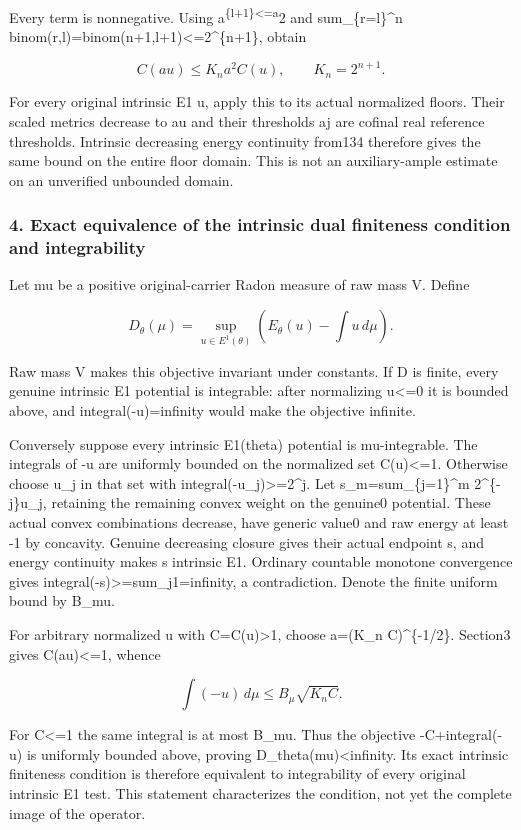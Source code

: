 \documentclass[
  10pt,
]{article}
\begin{document}
Every term is nonnegative. Using a\textsuperscript{\{l+1\}\textless=a}2
and sum\_\{r=l\}\^{}n binom(r,l)=binom(n+1,l+1)\textless=2\^{}\{n+1\},
obtain

\[C(au)\le K_n a^2 C(u),\qquad K_n=2^{n+1}.\]

For every original intrinsic E1 u, apply this to its actual normalized
floors. Their scaled metrics decrease to au and their thresholds aj are
cofinal real reference thresholds. Intrinsic decreasing energy
continuity from134 therefore gives the same bound on the entire floor
domain. This is not an auxiliary-ample estimate on an unverified
unbounded domain.

\subsubsection{4. Exact equivalence of the intrinsic dual finiteness
condition and
integrability}\label{exact-equivalence-of-the-intrinsic-dual-finiteness-condition-and-integrability}

Let mu be a positive original-carrier Radon measure of raw mass V.
Define

\[D_\theta(\mu)=\sup_{u\in E^1(\theta)}
\left(E_\theta(u)-\int u\,d\mu\right).\]

Raw mass V makes this objective invariant under constants. If D is
finite, every genuine intrinsic E1 potential is integrable: after
normalizing u\textless=0 it is bounded above, and integral(-u)=infinity
would make the objective infinite.

Conversely suppose every intrinsic E1(theta) potential is mu-integrable.
The integrals of -u are uniformly bounded on the normalized set
C(u)\textless=1. Otherwise choose u\_j in that set with
integral(-u\_j)\textgreater=2\^{}j. Let s\_m=sum\_\{j=1\}\^{}m
2\^{}\{-j\}u\_j, retaining the remaining convex weight on the genuine0
potential. These actual convex combinations decrease, have generic
value0 and raw energy at least -1 by concavity. Genuine decreasing
closure gives their actual endpoint s, and energy continuity makes s
intrinsic E1. Ordinary countable monotone convergence gives
integral(-s)\textgreater=sum\_j1=infinity, a contradiction. Denote the
finite uniform bound by B\_mu.

For arbitrary normalized u with C=C(u)\textgreater1, choose a=(K\_n
C)\^{}\{-1/2\}. Section3 gives C(au)\textless=1, whence

\[\int(-u)\,d\mu\le B_\mu\sqrt{K_n C}.\]

For C\textless=1 the same integral is at most B\_mu. Thus the objective
-C+integral(-u) is uniformly bounded above, proving
D\_theta(mu)\textless infinity. Its exact intrinsic finiteness condition
is therefore equivalent to integrability of every original intrinsic E1
test. This statement characterizes the condition, not yet the complete
image of the operator.
\end{document}
